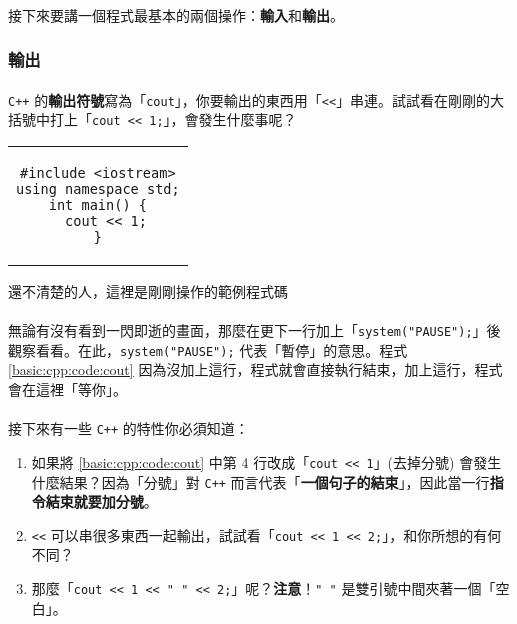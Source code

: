 \documentclass[12pt,a4paper,oneside]{article}
\begin{document}
\begin{CJK}{UTF8}{bkai}
\paragraph{}接下來要講一個程式最基本的兩個操作：\textbf{輸入}和\textbf{輸出}。

\subsubsection{輸出}

\paragraph{}\texttt{C++} 的\textbf{輸出符號}寫為「\lstinline!cout!」，你要輸出的東西用「\lstinline!<<!」串連。試試看在剛剛的大括號中打上「\lstinline!cout << 1;!」，會發生什麼事呢？

\begin{code}[h!]
\centering
\begin{tabular}{c}
\begin{lstlisting}
#include <iostream>
using namespace std;
int main() {
  cout << 1;
}
\end{lstlisting}
\end{tabular}
\caption{還不清楚的人，這裡是剛剛操作的範例程式碼}
\label{basic:cpp:code:cout}
\end{code}

\paragraph{}無論有沒有看到一閃即逝的畫面，那麼在更下一行加上「\lstinline!system("PAUSE");!」後觀察看看。在此，\lstinline!system("PAUSE");! 代表「暫停」的意思。程式 \ref{basic:cpp:code:cout} 因為沒加上這行，程式就會直接執行結束，加上這行，程式會在這裡「等你」。

\paragraph{}接下來有一些 \texttt{C++} 的特性你必須知道：
\begin{enumerate}
\item 如果將 \ref{basic:cpp:code:cout} 中第 4 行改成「\lstinline!cout << 1!」(去掉分號) 會發生什麼結果？因為「分號」對 \texttt{C++} 而言代表「\textbf{一個句子的結束}」，因此當一行\textbf{指令結束就要加分號}。
\item \lstinline!<<! 可以串很多東西一起輸出，試試看「\lstinline!cout << 1 << 2;!」，和你所想的有何不同？
\item 那麼「\lstinline!cout << 1 << " " << 2;!」呢？\textbf{注意}！\lstinline!" "! 是雙引號中間夾著一個「空白」。
\end{enumerate}


\end{CJK}
\end{document}
